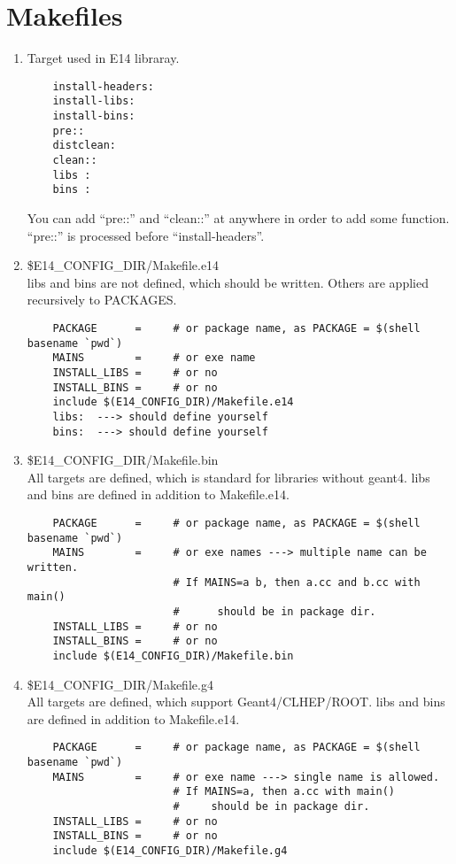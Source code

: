 \documentclass[a4paper,12pt]{article}
\begin{document}
 \section{Makefiles}
   \begin{enumerate}
    \item Target used in E14 libraray.
	  \begin{verbatim}
	install-headers:
	install-libs:
	install-bins:
	pre::
	distclean:
	clean::
	libs : 
	bins :
	  \end{verbatim}
	  You can add ``pre::'' and ``clean::'' at anywhere in order to
	  add some function. ``pre::'' is processed before ``install-headers''.
    \item \$E14\_CONFIG\_DIR/Makefile.e14\\
	  libs and bins are not defined, which should be written.
	  Others are applied recursively to PACKAGES.
	  \begin{verbatim}
	PACKAGE      =     # or package name, as PACKAGE = $(shell basename `pwd`)
	MAINS        =     # or exe name
	INSTALL_LIBS =     # or no
	INSTALL_BINS =     # or no
	include $(E14_CONFIG_DIR)/Makefile.e14
	libs:  ---> should define yourself
	bins:  ---> should define yourself	
	  \end{verbatim}
    \item \$E14\_CONFIG\_DIR/Makefile.bin\\
	  All targets are defined, which is standard
	  for libraries without geant4.
	  libs and bins are defined in addition to Makefile.e14.
	  \begin{verbatim}
	PACKAGE      =     # or package name, as PACKAGE = $(shell basename `pwd`)
	MAINS        =     # or exe names ---> multiple name can be written.
	                   # If MAINS=a b, then a.cc and b.cc with main()
	                   #      should be in package dir.
	INSTALL_LIBS =     # or no
	INSTALL_BINS =     # or no
	include $(E14_CONFIG_DIR)/Makefile.bin
	  \end{verbatim}
    \item \$E14\_CONFIG\_DIR/Makefile.g4\\
	  All targets are defined,
	  which support Geant4/CLHEP/ROOT.
	  libs and bins are defined in addition to Makefile.e14.
	  \begin{verbatim}
	PACKAGE      =     # or package name, as PACKAGE = $(shell basename `pwd`)
	MAINS        =     # or exe name ---> single name is allowed.
	                   # If MAINS=a, then a.cc with main()
	                   #     should be in package dir. 
	INSTALL_LIBS =     # or no
	INSTALL_BINS =     # or no
	include $(E14_CONFIG_DIR)/Makefile.g4		
	  \end{verbatim}
   \end{enumerate}
\end{document}
